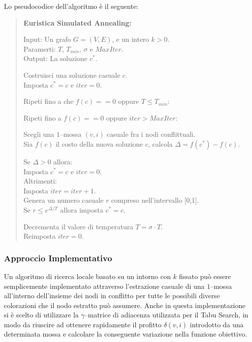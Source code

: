 \documentclass[a4paper,10pt]{article}
\begin{document}
Lo pseudocodice dell'algoritmo è il seguente:

\begin{quote}
\textbf{Euristica Simulated Annealing:}

Input: Un grafo $G=(V,E)$, e un intero $k>0$.\\
Paramerti: $T$, $T_{min}$, $\sigma$ e $MaxIter$.\\
Output: La soluzione $c^{*}$.

Costruisci una soluzione casuale $c$.\\
Imposta $c^{*}=c$ e $iter=0$.

Ripeti fino a che $f(c)==0$ oppure $T\leq T_{min}$:

\hspace*{8pt}Ripeti fino a $f(c)==0$ oppure $iter > MaxIter$:

\hspace*{16pt}Scegli una $1$--mossa $(v,i)$ casuale fra i nodi conflittuali.\\
\hspace*{16pt}Sia $f(c)$ il costo della nuova soluzione $c$, calcola $\Delta=f(c^{*})-f(c)$.

\hspace*{16pt}Se $\Delta > 0$ allora:\\
\hspace*{24pt}Imposta $c^{*}=c$ e $iter=0$.\\
\hspace*{16pt}Altrimenti:\\
\hspace*{24pt}Imposta $iter=iter+1$.\\
\hspace*{24pt}Genera un numero casuale $r$ compreso nell'intervallo [0,1].\\
\hspace*{24pt}Se $r\leq e^{\Delta/T}$ allora imposta $c^{*}=c$.

\hspace*{8pt}Decrementa il valore di temperatura $T=\sigma \cdot T$.\\
\hspace*{8pt}Reimposta $iter=0$.

\end{quote}

\subsubsection{Approccio Implementativo}
Un algoritmo di ricerca locale basato su un intorno con $k$ fissato può essere semplicemente implementato attraverso l'estrazione casuale di una $1$--mossa all'interno dell'insieme dei nodi in conflitto per tutte le possibili diverse colorazioni che il nodo estratto può assumere. 
Anche in questa implementazione si è scelto di utilizzare la $\gamma$--matrice di adiacenza utilizzata per il Tabu Search, in modo da riuscire ad ottenere rapidamente il profitto $\delta(v,i)$ introdotto da una determinata mossa e calcolare la conseguente variazione nella funzione obiettivo. 
\end{document}
